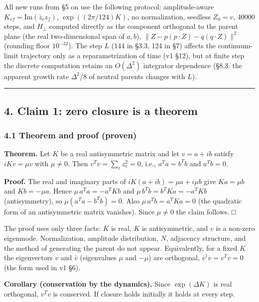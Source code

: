 \documentclass[
  10pt,
  a4paper,
]{article}
\begin{document}
All new runs from §5 on use the following protocol: amplitude-aware
\(K_{ef}=\mathrm{Im}(\bar z_ez_f)\), \(\exp((2\pi/124)K)\), no
normalization, seedless \(Z_0=v\), 40000 steps, and \(H_\perp\) computed
directly as the component orthogonal to the parent plane (the real
two-dimensional span of \(a,b\)), \(\|Z-p(p\cdot Z)-q(q\cdot Z)\|^2\)
(rounding floor \(10^{-32}\)). The step \(L\) (144 in §3.3, 124 in §7)
affects the continuum-limit trajectory only as a reparametrization of
time (v1 §12), but at finite step the discrete computation retains an
\(O(\Delta^2)\) integrator dependence (§8.3: the apparent growth rate
\(\Delta^2/8\) of neutral parents changes with \(L\)).

\begin{center}\rule{0.5\linewidth}{0.5pt}\end{center}

\subsection{4. Claim 1: zero closure is a
theorem}\label{claim-1-zero-closure-is-a-theorem}

\subsubsection{4.1 Theorem and proof
(proven)}\label{theorem-and-proof-proven}

\textbf{Theorem.} Let \(K\) be a real antisymmetric matrix and let
\(v=a+ib\) satisfy \(iKv=\mu v\) with \(\mu\ne0\). Then
\(v^Tv=\sum_e z_e^2=0\), i.e., \(a^Ta=b^Tb\) and \(a^Tb=0\).

\textbf{Proof.} The real and imaginary parts of
\(iK(a+ib)=\mu a+i\mu b\) give \(Ka=\mu b\) and \(Kb=-\mu a\). Hence
\(\mu\,a^Ta=-a^TKb\) and \(\mu\,b^Tb=b^TKa=-a^TKb\) (antisymmetry), so
\(\mu(a^Ta-b^Tb)=0\). Also \(\mu\,a^Tb=a^TKa=0\) (the quadratic form of
an antisymmetric matrix vanishes). Since \(\mu\ne0\) the claim follows.
□

The proof uses only three facts: \(K\) is real, \(K\) is antisymmetric,
and \(v\) is a non-zero eigenmode. Normalization, amplitude
distribution, \(N\), adjacency structure, and the method of generating
the parent do not appear. Equivalently, for a fixed \(K\) the
eigenvectors \(v\) and \(\bar v\) (eigenvalues \(\mu\) and \(-\mu\)) are
orthogonal, \(\bar v^\dagger v=v^Tv=0\) (the form used in v1 §6).

\textbf{Corollary (conservation by the dynamics).} Since
\(\exp(\Delta K)\) is real orthogonal, \(v^Tv\) is conserved. If closure
holds initially it holds at every step.
\end{document}
